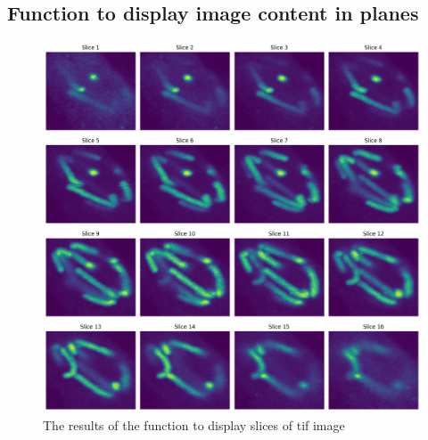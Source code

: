 \documentclass{article}
\begin{document}
\subsection*{Function to display image content in planes}
\begin{figure}[h!]
    \centering
    \includegraphics[width=1\linewidth]{Report/Images/3d_plot.png}
    \caption{The results of the function to display slices of tif image}
    \label{fig:3d-plane-image}
\end{figure}
% 
% 
\end{document}
